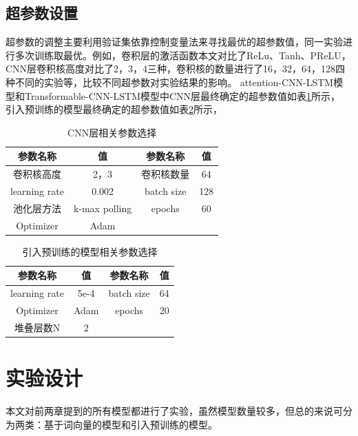 \subsection{超参数设置}
超参数的调整主要利用验证集依靠控制变量法来寻找最优的超参数值，同一实验进行多次训练取最优。例如，卷积层的激活函数本文对比了ReLu、Tanh、PReLU，
CNN层卷积核高度对比了2，3，4三种，卷积核的数量进行了16，32，64，128四种不同的实验等，比较不同超参数对实验结果的影响。
attention-CNN-LSTM模型和Transformable-CNN-LSTM模型中CNN层最终确定的超参数值如表\ref{tab:cnnPara}所示，
引入预训练的模型最终确定的超参数值如表\ref{tab:bertPara}所示，

\begin{table}[htb]
  \centering
  \caption{CNN层相关参数选择}
  \label{tab:cnnPara}
\begin{tabular}{cc|cc}
\hline
参数名称&值&参数名称&值\\
\hline
卷积核高度&2，3&卷积核数量&64\\
learning rate&0.002&batch size&128\\
池化层方法&k-max polling&epochs &60\\
Optimizer&Adam&&\\
\hline
\end{tabular}
\end{table}

\begin{table}[htb]
  \centering
  \caption{引入预训练的模型相关参数选择}
  \label{tab:bertPara}
\begin{tabular}{cc|cc}
\hline
参数名称&值&参数名称&值\\
\hline
learning rate&5e-4&batch size&64\\
Optimizer&Adam&epochs &20\\
堆叠层数N&2&&\\
\hline
\end{tabular}
\end{table}

\section{实验设计}
本文对前两章提到的所有模型都进行了实验，虽然模型数量较多，但总的来说可分为两类：基于词向量的模型和引入预训练的模型。
